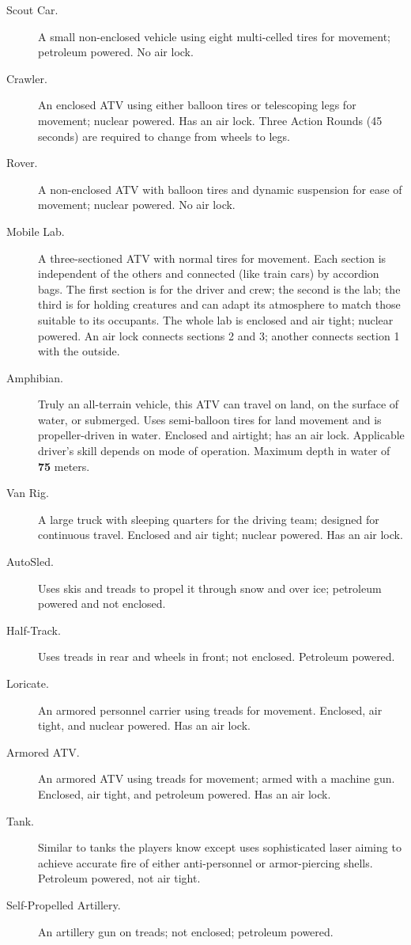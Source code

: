 \begin{description}
\item[Scout Car.]  A small non-enclosed vehicle using eight
  multi-celled tires for movement; petroleum powered. No air lock.
\item[Crawler.] An enclosed ATV using either balloon tires or
  telescoping legs for movement; nuclear powered. Has an air lock.
  Three Action Rounds (45 seconds) are required to change from wheels
  to legs.
\item[Rover.] A non-enclosed ATV with balloon tires and dynamic
  suspension for ease of movement; nuclear powered. No air lock.
\item[Mobile Lab.] A three-sectioned ATV with normal tires for
  movement. Each section is independent of the others and connected
  (like train cars) by accordion bags. The first section is for the
  driver and crew; the second is the lab; the third is for holding
  creatures and can adapt its atmosphere to match those suitable to
  its occupants. The whole lab is enclosed and air tight; nuclear
  powered.  An air lock connects sections 2 and 3; another connects
  section 1 with the outside.
\item[Amphibian.] Truly an all-terrain vehicle, this ATV can travel on
  land, on the surface of water, or submerged. Uses semi-balloon tires
  for land movement and is propeller-driven in water. Enclosed and
  airtight; has an air lock. Applicable driver's skill depends on mode
  of operation. Maximum depth in water of \textbf{75} meters.
\item[Van Rig.] A large truck with sleeping quarters for the driving
  team; designed for continuous travel. Enclosed and air tight;
  nuclear powered. Has an air lock.
\item[AutoSled.] Uses skis and treads to propel it through snow and
  over ice; petroleum powered and not enclosed.
\item[Half-Track.] Uses treads in rear and wheels in front; not
  enclosed. Petroleum powered.
\item[Loricate.] An armored personnel carrier using treads for
  movement. Enclosed, air tight, and nuclear powered. Has an air lock.
\item[Armored ATV.] An armored ATV using treads for movement; armed
  with a machine gun. Enclosed, air tight, and petroleum powered. Has
  an air lock.
\item[Tank.] Similar to tanks the players know except uses
  sophisticated laser aiming to achieve accurate fire of either
  anti-personnel or armor-piercing shells. Petroleum powered, not air
  tight.
\item[Self-Propelled Artillery.] An artillery gun on treads; not
  enclosed; petroleum powered.
\end{description}

